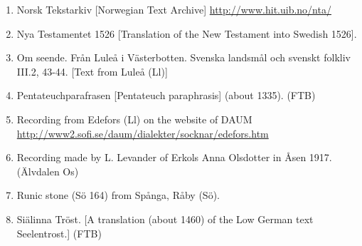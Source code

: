 \begin{enumerate}
\item 
\label{bkm:Ref137882336}Norsk Tekstarkiv [Norwegian Text Archive]\newline
\url{http://www.hit.uib.no/nta/}
\item 
\label{bkm:Ref137881523}Nya Testamentet 1526 [Translation of the New Testament into Swedish 1526].

\item 
\label{bkm:Ref159658122}Om seende. Från Luleå i Västerbotten. Svenska landsmål och svenskt folkliv III.2, 43-44. [Text from Luleå (Ll)]
\item 
\label{bkm:Ref137881441}Pentateuchparafrasen [Pentateuch paraphrasis] (about 1335). (FTB)

\item 
\label{bkm:Ref154213836}Recording from Edefors (Ll) on the website of DAUM\newline
\url{http://www2.sofi.se/daum/dialekter/socknar/edefors.htm}
\item 
\label{bkm:Ref154557175}Recording made by L. Levander of Erkols Anna Olsdotter in Åsen 1917. (Älvdalen Os)
\item 
\label{bkm:Ref154220979}Runic stone (Sö 164) from Spånga, Råby (Sö).

\item 
\label{bkm:Ref137881417}Siälinna Tröst. [A translation (about 1460) of the Low German text Seelentrost.] (FTB)


\end{enumerate}
